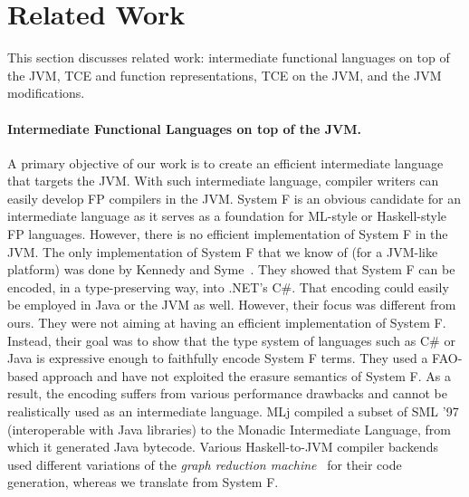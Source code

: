 \section{Related Work}

This section discusses related work: intermediate functional languages on top of the JVM,
TCE and function representations, TCE on the JVM, and the JVM modifications.

\paragraph{Intermediate Functional Languages on top of the JVM.}
A primary objective of our work is to create an efficient intermediate
language that targets the JVM. With such intermediate language,
compiler writers can easily develop FP compilers in the JVM.
System F is an obvious candidate for an intermediate language as it
serves as a foundation for ML-style or Haskell-style FP languages.
However, there is no efficient implementation of System F in the JVM.
The only implementation of System F that we know of (for a JVM-like
platform) was done by Kennedy and Syme~\cite{Kennedy2004}. They showed
that System F can be encoded, in a type-preserving way, into
.NET's C\#. That encoding could easily be employed in Java or the JVM as
well. However, their focus was different from ours. They were not aiming
at having an efficient implementation of System F. Instead, their goal
was to show that the type system of languages such as C\# or Java is
expressive enough to faithfully encode System F terms. They used a
FAO-based approach and have not exploited the erasure semantics of System F.
As a result, the encoding suffers from various performance drawbacks
and cannot be realistically used as an intermediate language. MLj
\cite{Benton1998} compiled a subset of SML '97 (interoperable with
Java libraries) to the Monadic Intermediate Language, from which it
generated Java bytecode. Various Haskell-to-JVM compiler backends
\cite{Wakeling1999,Tullsen1996,Choi2001} used different
variations of the \emph{graph reduction machine}~\cite{Wadsworth:1971} for their
code generation, whereas we translate from System F. 

